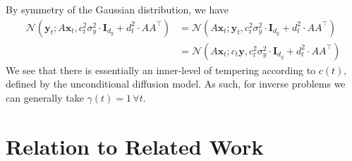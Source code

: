 \begin{remark}
    By symmetry of the Gaussian distribution, we have
    \begin{align*}
        \mathcal{N}(\mathbf{y}_t; A\mathbf{x}_t, c_t^2\sigma_y^2\cdot \mathbf{I}_{d_y} + d_t^2\cdot AA^\top) &= \mathcal{N}(A\mathbf{x}_t; \mathbf{y}_t, c_t^2\sigma_y^2\cdot \mathbf{I}_{d_y} + d_t^2\cdot AA^\top) \\
        &= \mathcal{N}(A\mathbf{x}_t; c_t\mathbf{y}, c_t^2\sigma_y^2\cdot \mathbf{I}_{d_y} + d_t^2\cdot AA^\top)
    \end{align*}
    We see that there is essentially an inner-level of tempering according to $c(t)$, defined by the
    unconditional diffusion model. As such, for inverse problems we can generally take
    $\gamma(t) = 1\, \forall t$.
\end{remark}

\section{Relation to Related Work} \label{sec:relation-to-related}

